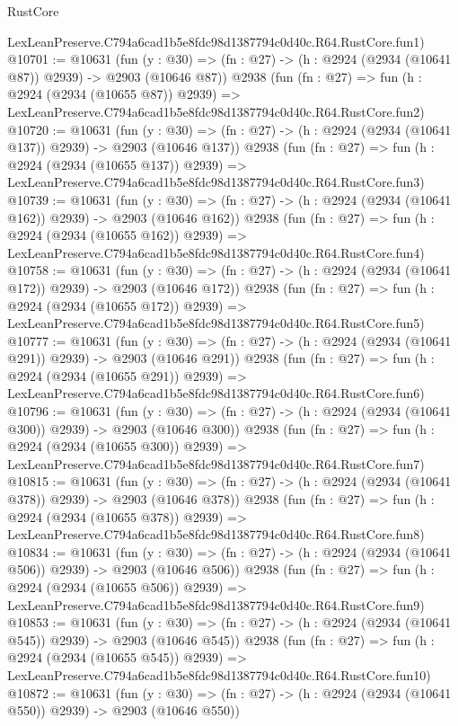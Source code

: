 \begin{lexlean}{RustCore}
\begin{coremodule}
    LexLeanPreserve.C794a6cad1b5e8fdc98d1387794c0d40c.R64.RustCore.fun1)
@10701 := @10631
    (fun (y : @30) => (fn : @27) -> (h : @2924 (@2934 (@10641 @87)) @2939) -> @2903 (@10646 @87))
    @2938
    (fun (fn : @27) =>
    fun (h : @2924 (@2934 (@10655 @87)) @2939) =>
    LexLeanPreserve.C794a6cad1b5e8fdc98d1387794c0d40c.R64.RustCore.fun2)
@10720 := @10631
    (fun (y : @30) => (fn : @27) -> (h : @2924 (@2934 (@10641 @137)) @2939) -> @2903 (@10646 @137))
    @2938
    (fun (fn : @27) =>
    fun (h : @2924 (@2934 (@10655 @137)) @2939) =>
    LexLeanPreserve.C794a6cad1b5e8fdc98d1387794c0d40c.R64.RustCore.fun3)
@10739 := @10631
    (fun (y : @30) => (fn : @27) -> (h : @2924 (@2934 (@10641 @162)) @2939) -> @2903 (@10646 @162))
    @2938
    (fun (fn : @27) =>
    fun (h : @2924 (@2934 (@10655 @162)) @2939) =>
    LexLeanPreserve.C794a6cad1b5e8fdc98d1387794c0d40c.R64.RustCore.fun4)
@10758 := @10631
    (fun (y : @30) => (fn : @27) -> (h : @2924 (@2934 (@10641 @172)) @2939) -> @2903 (@10646 @172))
    @2938
    (fun (fn : @27) =>
    fun (h : @2924 (@2934 (@10655 @172)) @2939) =>
    LexLeanPreserve.C794a6cad1b5e8fdc98d1387794c0d40c.R64.RustCore.fun5)
@10777 := @10631
    (fun (y : @30) => (fn : @27) -> (h : @2924 (@2934 (@10641 @291)) @2939) -> @2903 (@10646 @291))
    @2938
    (fun (fn : @27) =>
    fun (h : @2924 (@2934 (@10655 @291)) @2939) =>
    LexLeanPreserve.C794a6cad1b5e8fdc98d1387794c0d40c.R64.RustCore.fun6)
@10796 := @10631
    (fun (y : @30) => (fn : @27) -> (h : @2924 (@2934 (@10641 @300)) @2939) -> @2903 (@10646 @300))
    @2938
    (fun (fn : @27) =>
    fun (h : @2924 (@2934 (@10655 @300)) @2939) =>
    LexLeanPreserve.C794a6cad1b5e8fdc98d1387794c0d40c.R64.RustCore.fun7)
@10815 := @10631
    (fun (y : @30) => (fn : @27) -> (h : @2924 (@2934 (@10641 @378)) @2939) -> @2903 (@10646 @378))
    @2938
    (fun (fn : @27) =>
    fun (h : @2924 (@2934 (@10655 @378)) @2939) =>
    LexLeanPreserve.C794a6cad1b5e8fdc98d1387794c0d40c.R64.RustCore.fun8)
@10834 := @10631
    (fun (y : @30) => (fn : @27) -> (h : @2924 (@2934 (@10641 @506)) @2939) -> @2903 (@10646 @506))
    @2938
    (fun (fn : @27) =>
    fun (h : @2924 (@2934 (@10655 @506)) @2939) =>
    LexLeanPreserve.C794a6cad1b5e8fdc98d1387794c0d40c.R64.RustCore.fun9)
@10853 := @10631
    (fun (y : @30) => (fn : @27) -> (h : @2924 (@2934 (@10641 @545)) @2939) -> @2903 (@10646 @545))
    @2938
    (fun (fn : @27) =>
    fun (h : @2924 (@2934 (@10655 @545)) @2939) =>
    LexLeanPreserve.C794a6cad1b5e8fdc98d1387794c0d40c.R64.RustCore.fun10)
@10872 := @10631
    (fun (y : @30) => (fn : @27) -> (h : @2924 (@2934 (@10641 @550)) @2939) -> @2903 (@10646 @550))

\end{coremodule}
\end{lexlean}
